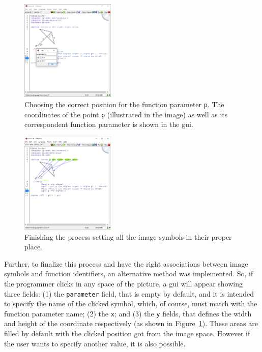 \begin{figure}[!h]
\centering
  \includegraphics[width=0.4\textwidth]{images/2}
  \caption{Choosing the correct position for the function parameter \texttt{p}. The coordinates of the point \texttt{p} (illustrated in the image) as well as its correspondent function parameter is shown in the \gls{gui}.}
\label{fig:gui-set-param}
\end{figure}

\begin{figure}[!h]
  \centering
  \includegraphics[width=0.4\textwidth]{images/4}
  \caption{Finishing the process setting all the image symbols in their proper place.}
  \label{fig:alright}
\end{figure}

Further, to finalize this process and have the right associations between image symbols and function identifiers, an alternative method was implemented. So, if the programmer clicks in any space of the picture, a \gls{gui} will appear showing three fields: (1) the \texttt{parameter} field, that is empty by default, and it is intended to specify the name of the clicked symbol, which, of course, must match with the function parameter name; (2) the \texttt{x}; and (3) the \texttt{y} fields, that defines the width and height of the coordinate respectively (as shown in Figure~\ref{fig:gui-set-param}). These areas are filled by default with the clicked position got from the image space. However if the user wants to specify another value, it is also possible.

